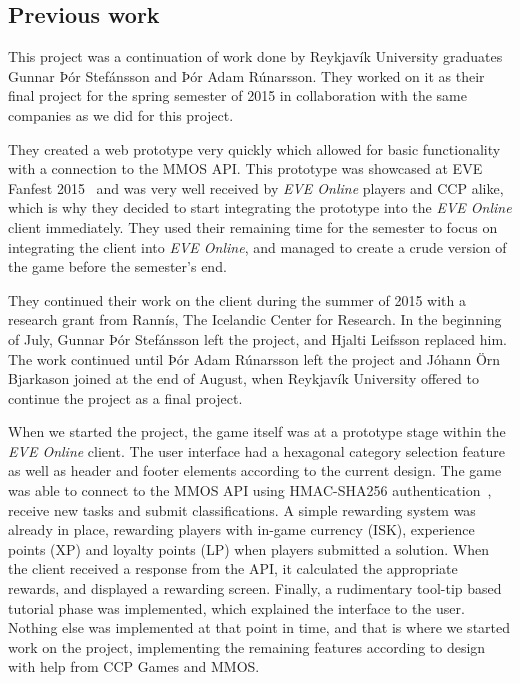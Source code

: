 \subsection{Previous work}
This project was a continuation of work done by Reykjavík University graduates Gunnar Þór Stefánsson and Þór Adam Rúnarsson. They worked on it as their final project for the spring semester of 2015 in collaboration with the same companies as we did for this project.

They created a web prototype very quickly which allowed for basic functionality with a connection to the MMOS API. This prototype was showcased at EVE Fanfest 2015~\cite{fanfest} and was very well received by \emph{EVE Online} players and CCP alike, which is why they decided to start integrating the prototype into the \emph{EVE Online} client immediately. They used their remaining time for the semester to focus on integrating the client into \emph{EVE Online}, and managed to create a crude version of the game before the semester's end.

They continued their work on the client during the summer of 2015 with a research grant from Rannís, The Icelandic Center for Research. In the beginning of July, Gunnar Þór Stefánsson left the project, and Hjalti Leifsson replaced him. The work continued until Þór Adam Rúnarsson left the project and Jóhann Örn Bjarkason joined at the end of August, when Reykjavík University offered to continue the project as a final project.

When we started the project, the game itself was at a prototype stage within the \emph{EVE Online} client. The user interface had a hexagonal category selection feature as well as header and footer elements according to the current design. The game was able to connect to the MMOS API using HMAC-SHA256 authentication~\cite{hmac}, receive new tasks and submit classifications. A simple rewarding system was already in place, rewarding players with in-game currency (ISK), experience points (XP) and loyalty points (LP) when players submitted a solution. When the client received a response from the API, it calculated the appropriate rewards, and displayed a rewarding screen. Finally, a rudimentary tool-tip based tutorial phase was implemented, which explained the interface to the user. Nothing else was implemented at that point in time, and that is where we started work on the project, implementing the remaining features according to design with help from CCP Games and MMOS.
